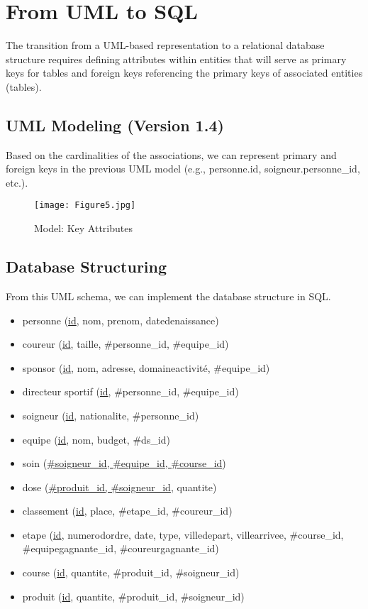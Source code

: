 \section{From UML to SQL}

The transition from a UML-based representation to a relational database structure requires defining attributes within entities that will serve as primary keys for tables and foreign keys referencing the primary keys of associated entities (tables).

\subsection{UML Modeling (Version 1.4)}

Based on the cardinalities of the associations, we can represent primary and foreign keys in the previous UML model (e.g., personne.id, soigneur.personne\_id, etc.).

\begin{figure}[H]
\begin{center}
\texttt{[image: Figure5.jpg]}\\
\caption{Model: Key Attributes}
\label{fig5}
\end{center}
\end{figure}

\subsection{Database Structuring}

From this UML schema, we can implement the database structure in SQL.

\begin{itemize}
\item personne (\underline{id}, nom, prenom, datedenaissance)
\item coureur (\underline{id}, taille, \#personne\_id, \#equipe\_id)
\item sponsor (\underline{id}, nom, adresse, domaineactivité, \#equipe\_id)
\item directeur sportif (\underline{id}, \#personne\_id, \#equipe\_id)
\item soigneur (\underline{id}, nationalite, \#personne\_id)
\item equipe (\underline{id}, nom, budget, \#ds\_id)
\item soin (\underline{\#soigneur\_id, \#equipe\_id, \#course\_id})
\item dose (\underline{\#produit\_id, \#soigneur\_id}, quantite)
\item classement (\underline{id}, place, \#etape\_id, \#coureur\_id)
\item etape (\underline{id}, numerodordre, date, type, villedepart, villearrivee, \#course\_id, \#equipegagnante\_id, \#coureurgagnante\_id)
\item course (\underline{id}, quantite, \#produit\_id, \#soigneur\_id)
\item produit (\underline{id}, quantite, \#produit\_id, \#soigneur\_id)
\end{itemize}

